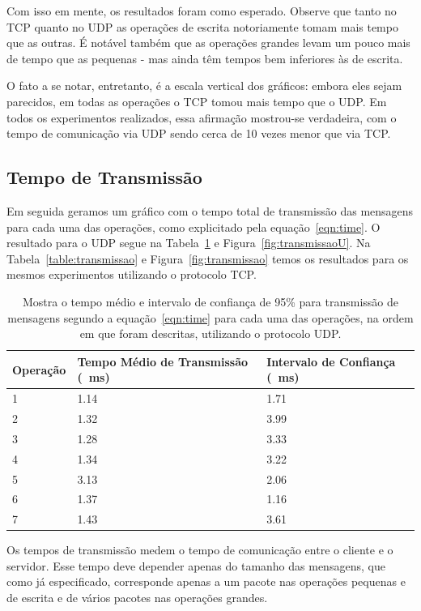 \documentclass[12pt,a4paper]{article}
\begin{document}
Com isso em mente, os resultados foram como esperado. Observe que tanto no TCP quanto no UDP as operações de escrita notoriamente tomam mais tempo que as outras. É notável também que as operações grandes levam um pouco mais de tempo que as pequenas - mas ainda têm tempos bem inferiores às de escrita.

O fato a se notar, entretanto, é a escala vertical dos gráficos: embora eles sejam parecidos, em todas as operações o TCP tomou mais tempo que o UDP. Em todos os experimentos realizados, essa afirmação mostrou-se verdadeira, com o tempo de comunicação via UDP sendo cerca de 10 vezes menor que via TCP.

\subsection{Tempo de Transmissão}

Em seguida geramos um gráfico com o tempo total de transmissão das mensagens para cada uma das operações, como explicitado pela equação~\ref{eqn:time}. O resultado para o UDP segue na Tabela~\ref{table:transmissaoU} e Figura~\ref{fig:transmissaoU}. Na Tabela~\ref{table:transmissao} e Figura~\ref{fig:transmissao} temos os resultados para os mesmos experimentos utilizando o protocolo TCP.

\begin{table}[h]
\centering
\caption{Mostra o tempo médio e intervalo de confiança de 95\% para transmissão de mensagens segundo a equação~\ref{eqn:time} para cada uma das operações, na ordem em que foram descritas, utilizando o protocolo UDP.}
\label{table:transmissaoU}
\begin{tabular}{lll}
Operação & Tempo Médio de Transmissão (\SI{}{\milli\second}) & Intervalo de Confiança (\SI{}{\milli\second}) \\ \hline
1        & 1.14           & 1.71 \\
2        & 1.32 & 3.99 \\
3        & 1.28 & 3.33 \\
4        & 1.34         & 3.22 \\
5        & 3.13 & 2.06 \\
6        & 1.37 & 1.16 \\
7        & 1.43           & 3.61 
\end{tabular}
\end{table}

Os tempos de transmissão medem o tempo de comunicação entre o cliente e o servidor. Esse tempo deve depender apenas do tamanho das mensagens, que como já especificado, corresponde apenas a um pacote nas operações pequenas e de escrita e de vários pacotes nas operações grandes. 
\end{document}

